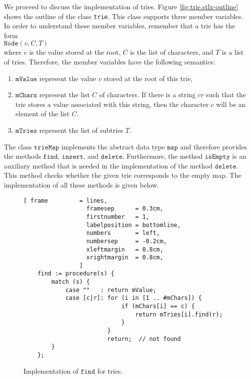 \noindent
We proceed to discuss the implementation of tries.  Figure \ref{fig:trie.stlx-outline} shows the
outline of the class \texttt{trie}.  This class supports three member variables.  In order to
understand these member variables, remember that a trie has the form
\\[0.2cm]
\hspace*{1.3cm}
$\mathtt{Node}(v, C, T)$
\\[0.2cm]
where $v$ is the value stored at the root, $C$ is the list of characters, and $T$ is a list of
tries.  Therefore, the member variables have the following semantics:
\begin{enumerate}
\item $\mathtt{mValue}$ represent the value $v$ stored at the root of this trie,  
\item $\mathtt{mChars}$ represent the list  $C$ of characters.  If there is a string $cr$ such that
      the trie stores a value associated with this string, then the character $c$ will be an element of
      the list $C$.
\item $\mathtt{mTries}$ represent the list of subtries $T$.  
\end{enumerate}
The class $\mathtt{trieMap}$ implements the abstract data type $\mathtt{map}$ and therefore provides the
methods $\mathtt{find}$, $\mathtt{insert}$, and $\mathtt{delete}$.  Furthermore, the method
$\mathtt{isEmpty}$ is an auxiliary method that is needed in the implementation of the method 
$\mathtt{delete}$.  This method checks whether the given trie corresponds to the empty map.  The
implementation of all these methods is given below. 

\begin{figure}[!ht]
\centering
\begin{Verbatim}[ frame         = lines, 
                  framesep      = 0.3cm, 
                  firstnumber   = 1,
                  labelposition = bottomline,
                  numbers       = left,
                  numbersep     = -0.2cm,
                  xleftmargin   = 0.8cm,
                  xrightmargin  = 0.8cm,
                ]
    find := procedure(s) {
        match (s) {
            case ""   : return mValue;
            case [c|r]: for (i in [1 .. #mChars]) {
                            if (mChars[i] == c) {
                                return mTries[i].find(r);
                            }
                        }
                        return;  // not found
        }
    };
\end{Verbatim}
\vspace*{-0.3cm}
\caption{Implementation of $\mathtt{find}$ for tries.}
\label{fig:trie.stlx-find}
\end{figure}

